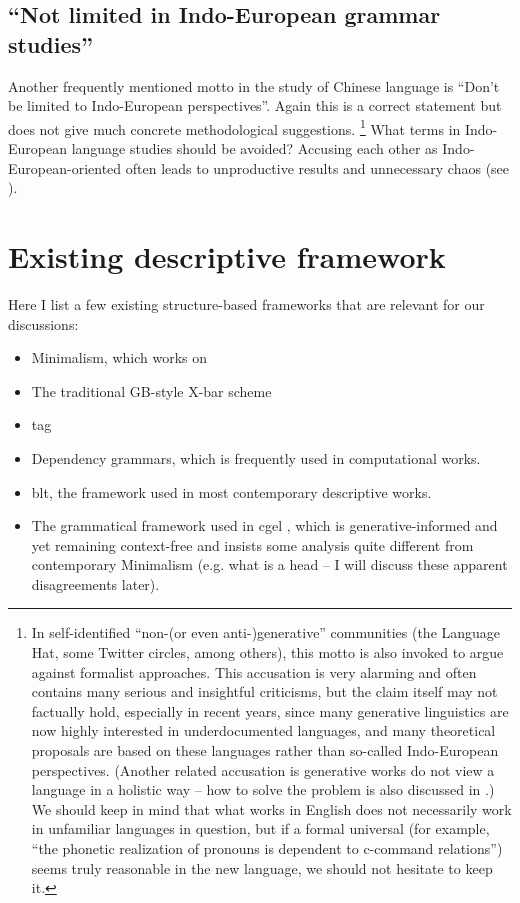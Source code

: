 \documentclass[../main.tex]{subfiles}
\begin{document}
\subsection{``Not limited in Indo-European grammar studies''}

Another frequently mentioned motto in the study of Chinese language is ``Don't be limited to Indo-European
perspectives''. Again this is a correct statement but does not give much concrete methodological suggestions.%
\footnote{
    In self-identified ``non-(or even anti-)generative'' communities (the Language Hat, some Twitter circles, 
    among others), this motto is also invoked to argue against formalist approaches. This accusation is very alarming and often contains many serious and insightful criticisms, but the claim itself may not factually 
    hold, especially in recent years, since many generative linguistics are now highly interested in
    underdocumented languages, and many theoretical proposals \citep{preminger2014agreement} are based on %
    these languages rather than so-called Indo-European perspectives. (Another related accusation is 
    generative works do not view a language in a holistic way -- how to solve the problem is also 
    discussed in .) We should keep in mind 
    that what works in English does not necessarily work in unfamiliar languages in question, but if 
    a formal universal (for example, ``the phonetic realization of pronouns is dependent to c-command relations'')
    seems truly reasonable in the new language, we should not hesitate to keep it.
}%
What terms in Indo-European language studies should be avoided? Accusing each other as Indo-European-oriented 
often leads to unproductive results and unnecessary chaos (see ). %

\section{Existing descriptive framework}\label{sec:descriptive-framework}

Here I list a few existing structure-based frameworks that are relevant for our discussions:
\begin{itemize}
    \item Minimalism, which works on 
    \item The traditional GB-style X-bar scheme
    \item \ac{tag}  %
    \item Dependency grammars, which is frequently used in computational works.
    \item \ac{blt}, the framework used in most contemporary descriptive works.
    \item The grammatical framework used in \ac{cgel} \citep{cgel,pullum2008expressive}, which is generative-informed and yet remaining 
    context-free and insists some analysis quite different from contemporary Minimalism (e.g. 
    what is a head -- I will discuss these apparent disagreements later).
\end{itemize}
\end{document}
